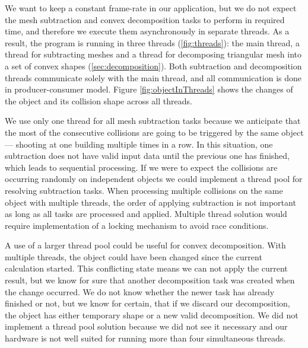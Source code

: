 We want to keep a constant frame-rate in our application, but we do not expect the mesh subtraction and convex decomposition tasks to perform in required time, and therefore we execute them asynchronously in separate threads. As a result, the program is running in three threads (\cref{fig:threads}): the main thread, a thread for subtracting meshes and a thread for decomposing triangular mesh into a set of convex shapes (\cref{sec:decomposition}). Both subtraction and decomposition threads communicate solely with the main thread, and all communication is done in producer-consumer model. Figure \ref{fig:objectInThreads} shows the changes of the object and its collision shape across all threads.

We use only one thread for all mesh subtraction tasks because we anticipate that the most of the consecutive collisions are going to be triggered by the same object --- shooting at one building multiple times in a row. In this situation, one subtraction does not have valid input data until the previous one has finished, which leads to sequential processing. If we were to expect the collisions are occurring randomly on independent objects we could implement a thread pool for resolving subtraction tasks. When processing multiple collisions on the same object with multiple threads, the order of applying subtraction is not important as long as all tasks are processed and applied. Multiple thread solution would require implementation of a locking mechanism to avoid race conditions.

A use of a larger thread pool could be useful for convex decomposition. With multiple threads, the object could have been changed since the current calculation started. This conflicting state means we can not apply the current result, but we know for sure that another decomposition task was created when the change occurred. We do not know whether the newer task has already finished or not, but we know for certain, that if we discard our decomposition, the object has either temporary shape or a new valid decomposition. We did not implement a thread pool solution because we did not see it necessary and our hardware  is not well suited for running more than four simultaneous threads.


